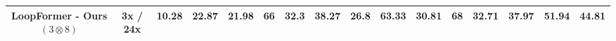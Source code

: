 \begin{table}[]
{\begin{tabular}{cccccccccccccccc}
\multicolumn{1}{c|}{LoopFormer - Ours $(3 \otimes 8)$} &
  \multicolumn{1}{c|}{3x / 24x} &
  {10.28} &
  { 22.87} &
  \multicolumn{1}{c|}{{ 21.98}} &
  {66} &
  32.3 &
  38.27 &
  26.8 &
  {63.33} &
  {30.81} &
  68 &
  { 32.71} &
  37.97 &
  \multicolumn{1}{c|}{{51.94}} &
  44.81 \\ \hline

\bottomrule
\end{tabular}%
}
\end{table}
